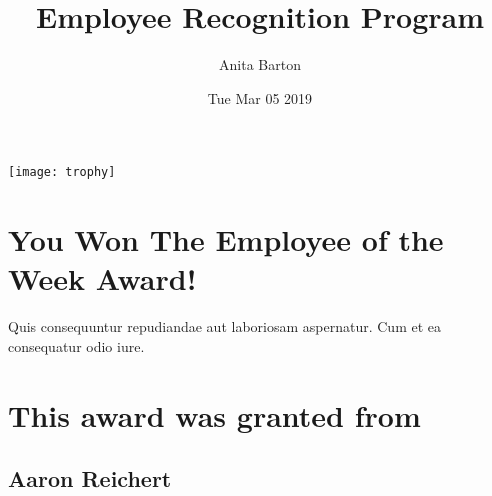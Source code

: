 \documentclass[12pt, letterpaper]{article}
\title{Employee Recognition Program}
\author{Anita Barton}
\date{Tue Mar 05 2019}
\begin{document}
\maketitle
\begin{center}
\texttt{[image: trophy]}
\section*{You Won The Employee of the Week Award!}
Quis consequuntur repudiandae aut laboriosam aspernatur. Cum et ea consequatur odio iure.
\section*{This award was granted from}
\subsection*{Aaron Reichert}
\end{center}
\end{document}

